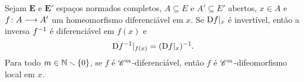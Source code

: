 \begin{proposition}
\label{prop:diferenciabilidade.homeomorfismo.inverso}
Sejam $\bm E$ e $\bm E'$ espaços normados completos, $A \subseteq E$ e $A' \subseteq E'$ abertos, $x \in A$ e ${f}\colon {A} \longrightarrow {A'}$ um homeomorfismo diferenciável em $x$. Se $\mathrm{D} f|_x$ é invertível, então a inversa $f^{-1}$ é diferenciável em $f(x)$ e
	\begin{equation*}
	\mathrm{D} f^{-1}|_{f(x)} = (\mathrm{D} f|_x)^{-1}.
	\end{equation*}
Para todo $m \in \mathbb{N} \smallsetminus \{0\}$, se $f$ é $\mathscr{C}^m$-diferenciável, então $f$ é $\mathscr{C}^m$-difeomorfismo local em $x$.
\end{proposition}
